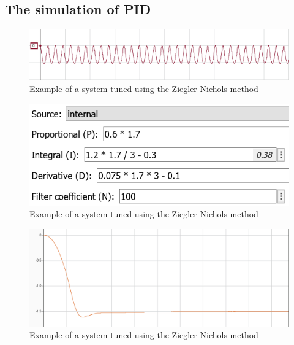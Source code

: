 \subsection{The simulation of PID}

\begin{figure}[H]
    \begin{center}
    \includegraphics[scale=0.75]{pictures/control/posc}
    \end{center}
    \caption{Example of a system tuned using the Ziegler-Nichols method\cite{LibrePID}}
    \label{fig:posc}
\end{figure}

\begin{figure}[H]
    \begin{center}
    \includegraphics[scale=0.7]{pictures/control/simpidvalues}
    \end{center}
    \caption{Example of a system tuned using the Ziegler-Nichols method\cite{LibrePID}}
    \label{fig:simpidvalues}
\end{figure}

\begin{figure}[H]
    \begin{center}
    \includegraphics[scale=0.7]{pictures/control/zpidnonoise}
    \end{center}
    \caption{Example of a system tuned using the Ziegler-Nichols method\cite{LibrePID}}
    \label{fig:zpidnonoise}
\end{figure}

